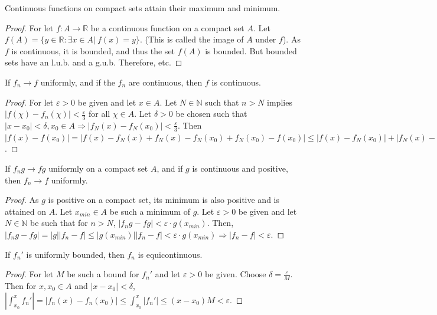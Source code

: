 \documentclass[crop=false,class=book,oneside]{standalone}
\begin{document}
            \begin{corollary}
                Continuous functions on compact sets attain their maximum and minimum.
            \end{corollary}
            \begin{proof}
                For let $f:A\rightarrow \mathbb{R}$ be a continuous function on a compact set $A$. Let $f(A) = \{y\in \mathbb{R}:\exists x\in A|\ f(x)=y\}$. (This is called the image of $A$ under $f$). As $f$ is continuous, it is bounded, and thus the set $f(A)$ is bounded. But bounded sets have an l.u.b. and a g.u.b. Therefore, etc.
            \end{proof}
            \begin{lemma}
                If $f_n\rightarrow f$ uniformly, and if the $f_n$ are continuous, then $f$ is continuous.
            \end{lemma}
            \begin{proof}
                For let $\varepsilon>0$ be given and let $x\in A$. Let $N\in \mathbb{N}$ such that $n>N$ implies $|f(\chi)-f_n(\chi)|<\frac{\varepsilon}{3}$ for all $\chi\in A$. Let $\delta>0$ be chosen such that $|x-x_0|<\delta, x_0\in A\Rightarrow |f_N(x)-f_N(x_0)|<\frac{\varepsilon}{3}$. Then  $|f(x)-f(x_0)|=|f(x)-f_N(x)+f_N(x)-f_N(x_0)+f_N(x_0)-f(x_0)|\leq |f(x)-f_N(x_0)|+|f_N(x)-f_N(x_0)|+|f(x_0)-f_N(x_0)|<\varepsilon$.
            \end{proof}
            \begin{theorem}
                If $f_ng\rightarrow fg$ uniformly on a compact set $A$, and if $g$ is continuous and positive, then $f_n\rightarrow f$ uniformly.
            \end{theorem}
            \begin{proof}
                As $g$ is positive on a compact set, its minimum is also positive and is attained on $A$. Let $x_{min}\in A$ be such a minimum of $g$. Let $\varepsilon>0$ be given and let $N\in \mathbb{N}$ be such that for $n>N$, $|f_ng-fg|<\varepsilon\cdot g(x_{min})$. Then, $|f_ng-fg|=|g||f_n-f|\leq |g(x_{min})||f_n-f|<\varepsilon \cdot g(x_{min})\Rightarrow |f_n-f|<\varepsilon$.
            \end{proof}
            \begin{lemma}
                If $f_n'$ is uniformly bounded, then $f_n$ is equicontinuous.
            \end{lemma}
            \begin{proof}
                For let $M$ be such a bound for $f_n'$ and let $\varepsilon>0$ be given. Choose $\delta = \frac{\varepsilon}{M}$. Then for $x,x_0\in A$ and $|x-x_0|<\delta$, $|\int_{x_0}^{x}f_n'| =|f_n(x)-f_n(x_0)| \leq \int_{x_0}^{x}|f_n'| \leq (x-x_0)M < \varepsilon$.
            \end{proof}
\end{document}

